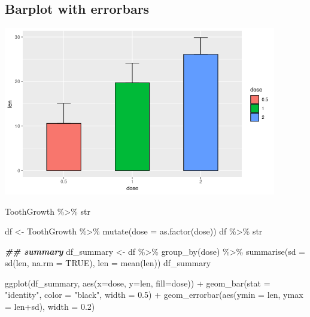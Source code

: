 \documentclass[
]{book}
\newenvironment{Shaded}{\begin{snugshade}}{\end{snugshade}}
\newcommand{\AttributeTok}[1]{\textcolor[rgb]{0.77,0.63,0.00}{#1}}
\newcommand{\ConstantTok}[1]{\textcolor[rgb]{0.00,0.00,0.00}{#1}}
\newcommand{\DocumentationTok}[1]{\textcolor[rgb]{0.56,0.35,0.01}{\textbf{\textit{#1}}}}
\newcommand{\FloatTok}[1]{\textcolor[rgb]{0.00,0.00,0.81}{#1}}
\newcommand{\FunctionTok}[1]{\textcolor[rgb]{0.00,0.00,0.00}{#1}}
\newcommand{\NormalTok}[1]{#1}
\newcommand{\OtherTok}[1]{\textcolor[rgb]{0.56,0.35,0.01}{#1}}
\newcommand{\SpecialCharTok}[1]{\textcolor[rgb]{0.00,0.00,0.00}{#1}}
\newcommand{\StringTok}[1]{\textcolor[rgb]{0.31,0.60,0.02}{#1}}
\begin{document}
\hypertarget{barplot-with-errorbars}{%
\subsection{Barplot with errorbars}\label{barplot-with-errorbars}}

\includegraphics[width=4.6875in,height=\textheight]{images/10/00000e.png}

\begin{Shaded}
\begin{Highlighting}[]
\NormalTok{ToothGrowth }\SpecialCharTok{\%\textgreater{}\%}\NormalTok{ str}

\NormalTok{df }\OtherTok{\textless{}{-}}\NormalTok{ ToothGrowth }\SpecialCharTok{\%\textgreater{}\%} 
  \FunctionTok{mutate}\NormalTok{(}\AttributeTok{dose =} \FunctionTok{as.factor}\NormalTok{(dose))}
\NormalTok{df }\SpecialCharTok{\%\textgreater{}\%}\NormalTok{ str}

\DocumentationTok{\#\# summary}
\NormalTok{df\_summary }\OtherTok{\textless{}{-}}\NormalTok{ df }\SpecialCharTok{\%\textgreater{}\%}
  \FunctionTok{group\_by}\NormalTok{(dose) }\SpecialCharTok{\%\textgreater{}\%}
  \FunctionTok{summarise}\NormalTok{(}\AttributeTok{sd =} \FunctionTok{sd}\NormalTok{(len, }\AttributeTok{na.rm =} \ConstantTok{TRUE}\NormalTok{), }\AttributeTok{len =} \FunctionTok{mean}\NormalTok{(len))}
\NormalTok{df\_summary}


\FunctionTok{ggplot}\NormalTok{(df\_summary, }\FunctionTok{aes}\NormalTok{(}\AttributeTok{x=}\NormalTok{dose, }\AttributeTok{y=}\NormalTok{len, }\AttributeTok{fill=}\NormalTok{dose)) }\SpecialCharTok{+}
  \FunctionTok{geom\_bar}\NormalTok{(}\AttributeTok{stat =} \StringTok{"identity"}\NormalTok{, }\AttributeTok{color =} \StringTok{"black"}\NormalTok{, }\AttributeTok{width =} \FloatTok{0.5}\NormalTok{) }\SpecialCharTok{+}
  \FunctionTok{geom\_errorbar}\NormalTok{(}\FunctionTok{aes}\NormalTok{(}\AttributeTok{ymin =}\NormalTok{ len, }\AttributeTok{ymax =}\NormalTok{ len}\SpecialCharTok{+}\NormalTok{sd), }\AttributeTok{width =} \FloatTok{0.2}\NormalTok{) }
\end{Highlighting}
\end{Shaded}
\end{document}
